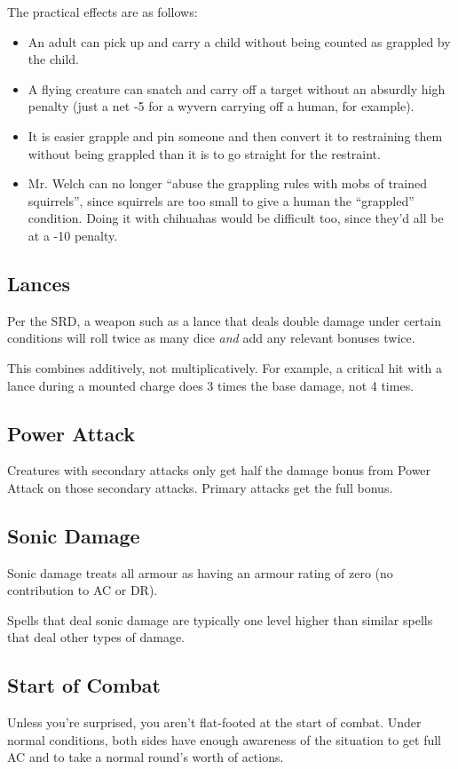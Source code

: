 The practical effects are as follows:
\begin{itemize}
\item An adult can pick up and carry a child without being counted as
grappled by the child.
\item A flying creature can snatch and carry off a target without an absurdly
high penalty (just a net -5 for a wyvern carrying off a human, for example).
\item It is easier grapple and pin someone and then convert it to restraining
them without being grappled than it is to go straight for the restraint.
\item Mr. Welch can no longer ``abuse the grappling rules with mobs of
trained squirrels'', since squirrels are too small to give a human the
``grappled'' condition. Doing it with chihuahas would be difficult too, since
they'd all be at a -10 penalty.
\end{itemize}

%
\subsection{Lances}

Per the SRD, a weapon such as a lance that deals double damage under certain
conditions will roll twice as many dice \textit{and} add any relevant bonuses
twice.

This combines additively, not multiplicatively. For example, a critical hit
with a lance during a mounted charge does 3 times the base damage, not 4
times.

%
\subsection{Power Attack}

Creatures with secondary attacks only get half the damage bonus from Power
Attack on those secondary attacks. Primary attacks get the full bonus.

%
\subsection{Sonic Damage}

Sonic damage treats all armour as having an armour rating of zero (no
contribution to AC or DR).

Spells that deal sonic damage are typically one level higher than similar
spells that deal other types of damage.

%
\subsection{Start of Combat}

Unless you're surprised, you aren't flat-footed at the start of combat.
Under normal conditions, both sides have enough awareness of the situation
to get full AC and to take a normal round's worth of actions.

%
